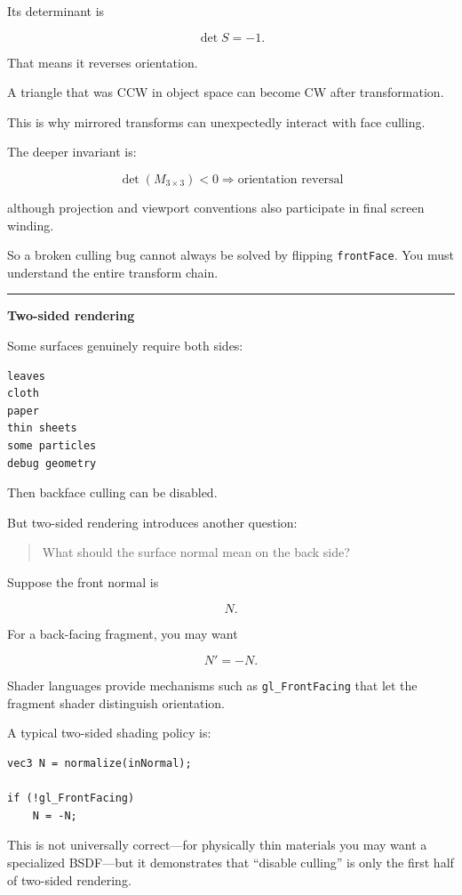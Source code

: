Its determinant is

\[
\det S=-1.
\]

That means it reverses orientation.

A triangle that was CCW in object space can become CW after transformation.

This is why mirrored transforms can unexpectedly interact with face culling.

The deeper invariant is:

\[
\boxed{
\det(M_{3\times3})<0
\Rightarrow
\text{orientation reversal}
}
\]

although projection and viewport conventions also participate in final screen winding.

So a broken culling bug cannot always be solved by flipping \texttt{frontFace}. You must understand the entire transform chain.

\begin{center}\rule{0.5\linewidth}{0.5pt}\end{center}

\textbf{Two-sided rendering}

Some surfaces genuinely require both sides:

\begin{verbatim}
leaves
cloth
paper
thin sheets
some particles
debug geometry
\end{verbatim}

Then backface culling can be disabled.

But two-sided rendering introduces another question:

\begin{quote}
What should the surface normal mean on the back side?
\end{quote}

Suppose the front normal is

\[
N.
\]

For a back-facing fragment, you may want

\[
N'=-N.
\]

Shader languages provide mechanisms such as \texttt{gl\_FrontFacing} that let the fragment shader distinguish orientation.

A typical two-sided shading policy is:

\begin{verbatim}
vec3 N = normalize(inNormal);

if (!gl_FrontFacing)
    N = -N;
\end{verbatim}

This is not universally correct---for physically thin materials you may want a specialized BSDF---but it demonstrates that ``disable culling'' is only the first half of two-sided rendering.

